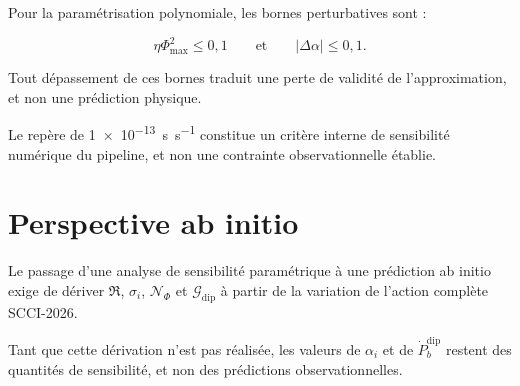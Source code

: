 \documentclass[11pt,a4paper]{article}
\begin{document}
Pour la paramétrisation polynomiale, les bornes perturbatives sont :

\begin{equation}
\eta\Phi_{\max}^2\le0{,}1
\qquad\text{et}\qquad
|\Delta\alpha|\le0{,}1 .
\end{equation}

Tout dépassement de ces bornes traduit une perte de validité de l'approximation, et non une prédiction physique.

Le repère de \SI{1e-13}{\second\per\second} constitue un critère interne de sensibilité numérique du pipeline, et non une contrainte observationnelle établie.

\section{Perspective ab initio}

Le passage d'une analyse de sensibilité paramétrique à une prédiction ab initio exige de dériver $\mathfrak R$, $\sigma_i$, $\mathcal N_\Phi$ et $\mathcal G_{\mathrm{dip}}$ à partir de la variation de l'action complète SCCI-2026.

Tant que cette dérivation n'est pas réalisée, les valeurs de $\alpha_i$ et de $\dot P_b^{\mathrm{dip}}$ restent des quantités de sensibilité, et non des prédictions observationnelles.
\end{document}
